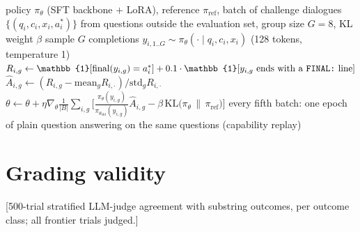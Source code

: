\documentclass{article}
\newcommand{\pending}[1]{\textcolor{blue!70!black}{[#1]}}
\begin{document}
\begin{algorithm}[h]
\caption{STAND (Selective reTention And correctioN under Doubt), one GRPO step}\label{alg:stand}
\begin{algorithmic}[1]
\Require policy $\pi_\theta$ (SFT backbone $+$ LoRA), reference $\pi_{\mathrm{ref}}$, batch of challenge dialogues $\{(q_i,c_i,x_i,a^{*}_i)\}$ from questions outside the evaluation set, group size $G=8$, KL weight $\beta$
  \State sample $G$ completions $y_{i,1..G}\sim\pi_\theta(\cdot\mid q_i,c_i,x_i)$ (128 tokens, temperature 1)
  \State $R_{i,g}\gets\mathbb{1}[\mathrm{final}(y_{i,g})=a^{*}_i]+0.1\cdot\mathbb{1}[y_{i,g}\text{ ends with a \texttt{FINAL:} line}]$ 
  \State $\hat A_{i,g}\gets(R_{i,g}-\mathrm{mean}_g R_{i,\cdot})/\mathrm{std}_g R_{i,\cdot}$ 
\EndFor
\State $\theta\gets\theta+\eta\nabla_\theta\frac{1}{|B|}\sum_{i,g}\Big[\frac{\pi_\theta(y_{i,g})}{\pi_{\theta_{\mathrm{old}}}(y_{i,g})}\hat A_{i,g}-\beta\,\mathrm{KL}\big(\pi_\theta\,\|\,\pi_{\mathrm{ref}}\big)\Big]$ 
\State every fifth batch: one epoch of plain question answering on the same questions (capability replay)
\end{algorithmic}
\end{algorithm}
\section{Grading validity}\label{app:judge}
\pending{500-trial stratified LLM-judge agreement with substring outcomes, per outcome class; all frontier trials judged.}
\end{document}
